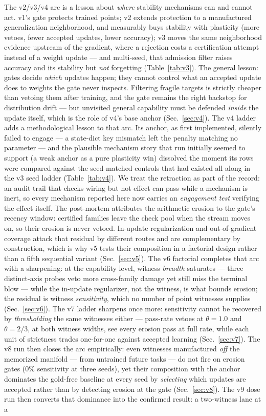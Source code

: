 \documentclass[10pt,conference]{IEEEtran}
\begin{document}
The v2/v3/v4 arc is a lesson about \emph{where} stability mechanisms can and cannot act. v1's gate protects trained points; v2 extends protection to a manufactured generalization neighborhood, and measurably buys stability with plasticity (more vetoes, fewer accepted updates, lower accuracy); v3 moves the same neighborhood evidence upstream of the gradient, where a rejection costs a certification attempt instead of a weight update --- and multi-seed, that admission filter raises accuracy and its stability but \emph{not} forgetting (Table~\ref{tab:v3}). The general lesson: gates decide \emph{which} updates happen; they cannot control what an accepted update does to weights the gate never inspects. Filtering fragile targets is strictly cheaper than vetoing them after training, and the gate remains the right backstop for distribution drift --- but unvisited general capability must be defended \emph{inside} the update itself, which is the role of v4's base anchor (Sec.~\ref{sec:v4}). The v4 ladder adds a methodological lesson to that arc. Its anchor, as first implemented, silently failed to engage --- a state-dict key mismatch left the penalty matching no parameter --- and the plausible mechanism story that run initially seemed to support (a weak anchor as a pure plasticity win) dissolved the moment its rows were compared against the seed-matched controls that had existed all along in the v3 seed ladder (Table~\ref{tab:v4}). We treat the retraction as part of the record: an audit trail that checks wiring but not effect can pass while a mechanism is inert, so every mechanism reported here now carries an \emph{engagement test} verifying the effect itself. The post-mortem attributes the arithmetic erosion to the gate's recency window: certified families leave the check pool when the stream moves on, so their erosion is never vetoed. In-update regularization and out-of-gradient coverage attack that residual by different routes and are complementary by construction, which is why v5 tests their composition in a factorial design rather than a fifth sequential variant (Sec.~\ref{sec:v5}). The v6 factorial completes that arc with a sharpening: at the capability level, witness \emph{breadth} saturates --- three distinct-axis probes veto more cross-family damage yet still miss the terminal blow --- while the in-update regularizer, not the witness, is what bounds erosion; the residual is witness \emph{sensitivity}, which no number of point witnesses supplies (Sec.~\ref{sec:v6}). The v7 ladder sharpens once more: sensitivity cannot be recovered by \emph{thresholding} the same witnesses either --- pass-rate vetoes at $\theta=1.0$ and $\theta=2/3$, at both witness widths, see every erosion pass at full rate, while each unit of strictness trades one-for-one against accepted learning (Sec.~\ref{sec:v7}). The v8 run then closes the arc empirically: even witnesses manufactured \emph{off} the memorized manifold --- from untrained future tasks --- do not fire on erosion gates ($0\%$ sensitivity at three seeds), yet their composition with the anchor dominates the gold-free baseline at every seed by \emph{selecting} which updates are accepted rather than by detecting erosion at the gate (Sec.~\ref{sec:v8}). The v9 dose run then converts that dominance into the confirmed result: a two-witness lane at a 
\end{document}

